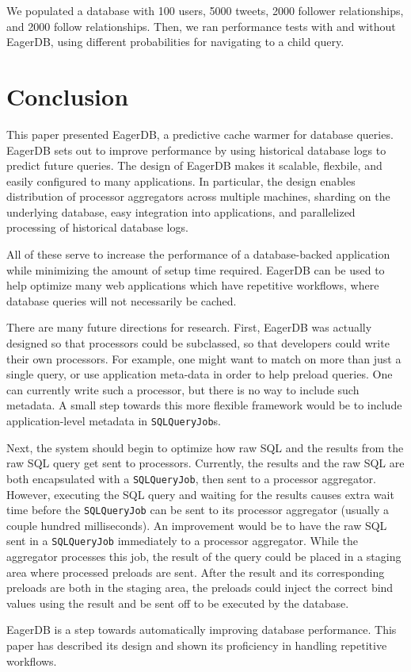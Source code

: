 \documentclass[12pt]{article}
\begin{document}
We populated a database with 100 users, 5000 tweets, 2000 follower relationships, and 2000 follow relationships. Then, we ran performance tests with and without EagerDB, using different probabilities for navigating to a child query.

\section{Conclusion}

This paper presented EagerDB, a predictive cache warmer for database queries. EagerDB sets out to improve performance by using historical database logs to predict future queries. The design of EagerDB makes it scalable, flexbile, and easily configured to many applications. In particular, the design enables distribution of processor aggregators across multiple machines, sharding on the underlying database, easy integration into applications, and parallelized processing of historical database logs.

All of these serve to increase the performance of a database-backed application while minimizing the amount of setup time required. EagerDB can be used to help optimize many web applications which have repetitive workflows, where database queries will not necessarily be cached.

There are many future directions for research. First, EagerDB was actually designed so that processors could be subclassed, so that developers could write their own processors. For example, one might want to match on more than just a single query, or use application meta-data in order to help preload queries. One can currently write such a processor, but there is no way to include such metadata. A small step towards this more flexible framework would be to include application-level metadata in \texttt{SQLQueryJob}s.

Next, the system should begin to optimize how raw SQL and the results from the raw SQL query get sent to processors. Currently, the results and the raw SQL are both encapsulated with a \texttt{SQLQueryJob}, then sent to a processor aggregator. However, executing the SQL query and waiting for the results causes extra wait time before the \texttt{SQLQueryJob} can be sent to its processor aggregator (usually a couple hundred milliseconds). An improvement would be to have the raw SQL sent in a \texttt{SQLQueryJob} immediately to a processor aggregator. While the aggregator processes this job, the result of the query could be placed in a staging area where processed preloads are sent. After the result and its corresponding preloads are both in the staging area, the preloads could inject the correct bind values using the result and be sent off to be executed by the database.

EagerDB is a step towards automatically improving database performance. This paper has described its design and shown its proficiency in handling repetitive workflows.
\end{document}
